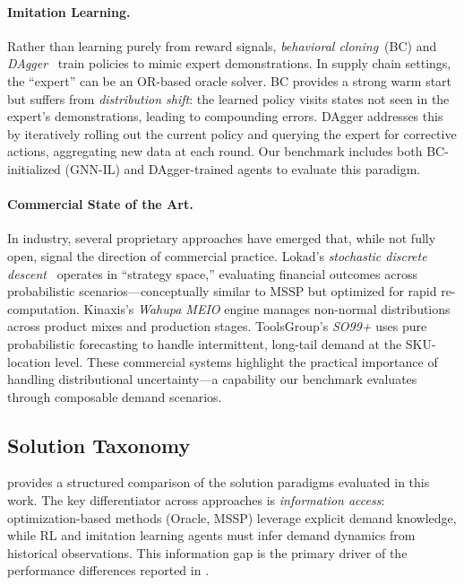 \paragraph{Imitation Learning.}
Rather than learning purely from reward signals, \emph{behavioral cloning}~(BC)
and \emph{DAgger}~\citep{ross2011reduction} train policies to mimic expert
demonstrations. In supply chain settings, the ``expert'' can be an OR-based
oracle solver. BC provides a strong warm start but suffers from
\emph{distribution shift}: the learned policy visits states not seen in the
expert's demonstrations, leading to compounding errors. DAgger addresses this
by iteratively rolling out the current policy and querying the expert for
corrective actions, aggregating new data at each round. Our benchmark
includes both BC-initialized (GNN-IL) and DAgger-trained agents to
evaluate this paradigm.

\paragraph{Commercial State of the Art.}
In industry, several proprietary approaches have emerged that, while not
fully open, signal the direction of commercial practice.
Lokad's \emph{stochastic discrete descent}~\citep{lokad2024} operates in
``strategy space,'' evaluating financial outcomes across probabilistic
scenarios---conceptually similar to MSSP but optimized for rapid
re-computation. Kinaxis's \emph{Wahupa MEIO} engine manages non-normal
distributions across product mixes and production stages.
ToolsGroup's \emph{SO99+} uses pure probabilistic forecasting to handle
intermittent, long-tail demand at the SKU-location level.
These commercial systems highlight the practical importance of handling
distributional uncertainty---a capability our benchmark evaluates through
composable demand scenarios.

\subsection{Solution Taxonomy}\label{sec:taxonomy}

 provides a structured comparison of the
solution paradigms evaluated in this work. The key differentiator across
approaches is \emph{information access}: optimization-based methods
(Oracle, MSSP) leverage explicit demand knowledge, while RL and
imitation learning agents must infer demand dynamics from historical
observations. This information gap is the primary driver of the
performance differences reported in .

